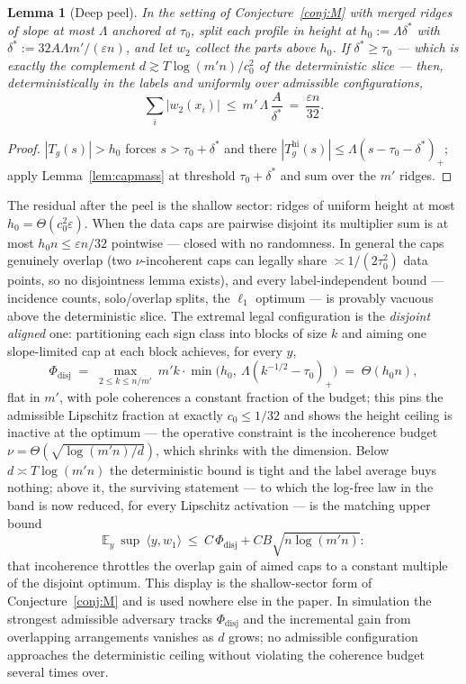 \documentclass[11pt,reqno]{amsart}
\theoremstyle{plain}
\newtheorem{lemma}[theorem]{Lemma}
\theoremstyle{definition}
\theoremstyle{remark}
\newcommand{\EE}{\mathbb{E}}
\newcommand{\eps}{\varepsilon}
\newcommand{\inn}[2]{\langle #1,#2\rangle}
\begin{document}
\begin{lemma}[Deep peel]\label{lem:deeppeel}
In the setting of Conjecture~\ref{conj:M} with merged ridges of slope at most $\Lambda$ anchored at $\tau_0$, split each profile in height at $h_0:=\Lambda\delta^\ast$ with $\delta^\ast:=32A\Lambda m'/(\eps n)$, and let $w_2$ collect the parts above $h_0$. If $\delta^\ast\ge\tau_0$ --- which is exactly the complement $d\gtrsim T\log(m'n)/c_0^2$ of the deterministic slice --- then, deterministically in the labels and uniformly over admissible configurations,
\[
\sum_i|w_2(x_i)|\ \le\ m'\,\Lambda\,\frac A{\delta^\ast}\ =\ \frac{\eps n}{32}.
\]
\end{lemma}
\begin{proof}[Proof]
$|T_g(s)|>h_0$ forces $s>\tau_0+\delta^\ast$ and there $|T_g^{\mathrm{hi}}(s)|\le\Lambda(s-\tau_0-\delta^\ast)_+$; apply Lemma~\ref{lem:capmass} at threshold $\tau_0+\delta^\ast$ and sum over the $m'$ ridges.
\end{proof}

The residual after the peel is the shallow sector: ridges of uniform height at most $h_0=\Theta(c_0^2\eps)$. When the data caps are pairwise disjoint its multiplier sum is at most $h_0n\le\eps n/32$ pointwise --- closed with no randomness. In general the caps genuinely overlap (two $\nu$-incoherent caps can legally share $\asymp1/(2\tau_0^2)$ data points, so no disjointness lemma exists), and every label-independent bound --- incidence counts, solo/overlap splits, the $\ell_1$ optimum --- is provably vacuous above the deterministic slice. The extremal legal configuration is the \emph{disjoint aligned} one: partitioning each sign class into blocks of size $k$ and aiming one slope-limited cap at each block achieves, for every $y$,
\[
\Phi_{\mathrm{disj}}\;=\;\max_{2\le k\le n/m'}\ m'k\cdot\min\bigl(h_0,\ \Lambda(k^{-1/2}-\tau_0)_+\bigr)\;=\;\Theta(h_0n),
\]
flat in $m'$, with pole coherences a constant fraction of the budget; this pins the admissible Lipschitz fraction at exactly $c_0\le1/32$ and shows the height ceiling is inactive at the optimum --- the operative constraint is the incoherence budget $\nu=\Theta(\sqrt{\log(m'n)/d})$, which shrinks with the dimension. Below $d\asymp T\log(m'n)$ the deterministic bound is tight and the label average buys nothing; above it, the surviving statement --- to which the log-free law in the band is now reduced, for every Lipschitz activation --- is the matching upper bound
\[
\EE_y\ \sup\ \inn y{w_1}\ \le\ C\,\Phi_{\mathrm{disj}}+CB\sqrt{n\log(m'n)}:
\]
that incoherence throttles the overlap gain of aimed caps to a constant multiple of the disjoint optimum. This display is the shallow-sector form of Conjecture~\ref{conj:M} and is used nowhere else in the paper. In simulation the strongest admissible adversary tracks $\Phi_{\mathrm{disj}}$ and the incremental gain from overlapping arrangements vanishes as $d$ grows; no admissible configuration approaches the deterministic ceiling without violating the coherence budget several times over.
\end{document}
